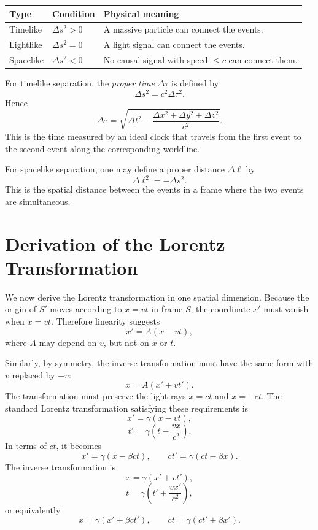 \begin{center}
\begin{tabular}{lll}
\toprule
Type & Condition & Physical meaning \\
\midrule
Timelike & \(\Delta s^2>0\) & A massive particle can connect the events. \\
Lightlike & \(\Delta s^2=0\) & A light signal can connect the events. \\
Spacelike & \(\Delta s^2<0\) & No causal signal with speed \(\leq c\) can connect them. \\
\bottomrule
\end{tabular}
\end{center}

For timelike separation, the \emph{proper time} \(\Delta\tau\) is defined by
\[
\Delta s^2=c^2\Delta\tau^2.
\]
Hence
\[
\Delta\tau
=\sqrt{\Delta t^2-\frac{\Delta x^2+\Delta y^2+\Delta z^2}{c^2}}.
\]
This is the time measured by an ideal clock that travels from the first event to
the second event along the corresponding worldline.

For spacelike separation, one may define a proper distance \(\Delta\ell\) by
\[
\Delta\ell^2=-\Delta s^2.
\]
This is the spatial distance between the events in a frame where the two events
are simultaneous.

\begin{center}
\end{center}

\clearpage

\section{Derivation of the Lorentz Transformation}

We now derive the Lorentz transformation in one spatial dimension.  Because the
origin of \(S'\) moves according to \(x=vt\) in frame \(S\), the coordinate
\(x'\) must vanish when \(x=vt\).  Therefore linearity suggests
\[
x'=A(x-vt),
\]
where \(A\) may depend on \(v\), but not on \(x\) or \(t\).

Similarly, by symmetry, the inverse transformation must have the same form with
\(v\) replaced by \(-v\):
\[
x=A(x'+vt').
\]
The transformation must preserve the light rays \(x=ct\) and \(x=-ct\).  The
standard Lorentz transformation satisfying these requirements is
\[
x'=\gamma(x-vt),
\]
\[
t'=\gamma\left(t-\frac{vx}{c^2}\right).
\]
In terms of \(ct\), it becomes
\[
x'=\gamma(x-\beta ct),
\qquad
ct'=\gamma(ct-\beta x).
\]
The inverse transformation is
\[
x=\gamma(x'+vt'),
\]
\[
t=\gamma\left(t'+\frac{vx'}{c^2}\right),
\]
or equivalently
\[
x=\gamma(x'+\beta ct'),
\qquad
ct=\gamma(ct'+\beta x').
\]

